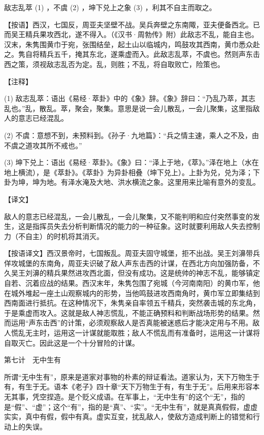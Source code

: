 \documentclass[12pt,UTF8]{ctexbook}
\begin{document}
敌志乱萃 (1) ，不虞 (2) ，坤下兑上之象 (3) ，利其不自主而取之。

【按语】西汉，七国反，周亚夫坚壁不战。吴兵奔壁之东南陬，亚夫便备西北。已而吴王精兵果攻西北，遂不得入。（《汉书·周勃传》附）此敌志不乱，能自主也。汉末，朱隽围黄巾于宛，张围结垒，起土山以临城内，鸣鼓攻其西南，黄巾悉众赴之。隽自将精兵五千，掩其东北，遂乘虚而入。此敌志乱萃，不虞也。然则声东击西之策，须视敌志乱否为定。乱，则胜；不乱，将自取败亡，险策也。





【注释】


(1) 敌志乱萃：语出《易经·萃卦》中的《象》辞。《象》辞曰：“乃乱乃萃，其志乱也。”乱，散乱。萃，聚会，聚集。意思是说一会儿散乱，一会儿聚集，这里指敌人的意志已经混乱。

(2) 不虞：意想不到，未预料到。《孙子·九地篇》：“兵之情主速，乘人之不及，由不虞之道攻其所不戒也。”

(3) 坤下兑上：语出《易经·萃卦》。《象》曰：“泽上于地，《萃》。”泽在地上（水在地上横流），是《萃卦》。《萃卦》为异卦相叠（坤下兑上）。上卦为兑，兑为泽；下卦为坤，坤为地。有泽水淹及大地、洪水横流之象。这里用来比喻有意外的变乱。





【译文】


敌人的意志已经混乱，一会儿散乱，一会儿聚集，又不能判明和应付突然事变的发生，这是指挥员失去分析判断情况的能力的一种征象。这时就要利用敌人失去控制力（不自主）的时机将其消灭。

【按语译文】西汉景帝时，七国叛乱。周亚夫固守城堡，拒不出战。吴王刘濞带兵佯攻城堡的东南角，周亚夫识破了敌人声东击西的计谋，在西北方向加强防备，不久吴王刘濞的精兵果然进攻西北面，但没有成功。这是统帅的神志不乱，能够镇定自若、沉着应战的结果。西汉末年，朱隽包围了宛城（今河南南阳）的黄巾军，他在城外堆起一座土山观察城内的形势，当他鸣鼓进攻西南角时，黄巾军立即集结到西南面进行抵抗。在这种情况下，朱隽亲自率领五千精兵，突然袭击城的东北角，于是乘虚而攻入。这就是敌人神志慌乱，不能正确预料和判断战场形势的结果。然而运用“声东击西”的计策，必须观察敌人是否真能被迷惑后才能决定用与不用。敌人慌乱无主时，运用这一计谋就能取胜；敌人不慌乱而有准备时，运用这一计谋将自取灭亡。因此这是一个十分冒险的计谋。





第七计　无中生有


所谓“无中生有”，原来是道家对事物的朴素的辩证看法。道家认为，天下万物生于有，有生于无。语本《老子》四十章“天下万物生于有，有生于无”。后用来形容本无其事，凭空捏造。是个贬义成语。在军事上，“无中生有”的这个“无”，指的是“假”、“虚”；这个“有”，指的是“真”、“实”。“无中生有”，就是真真假假，虚虚实实，真中有假，假中有真。虚实互变，扰乱敌人，使敌方造成判断上的错觉和行动上的失误。
\end{document}
